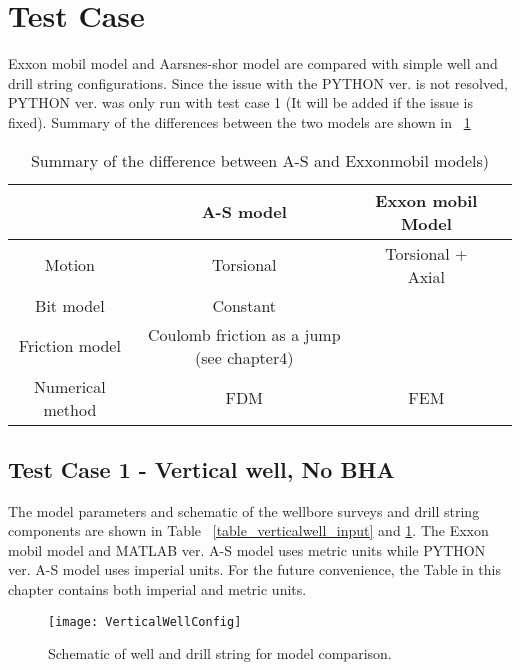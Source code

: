 \section{Test Case}
Exxon mobil model and Aarsnes-shor model are compared with simple well and drill string configurations. Since the issue with the PYTHON ver. is not resolved, PYTHON ver. was only run with test case 1 (It will be added if the issue is fixed). Summary of the differences between the two models are shown in \tablename~\ref{table_model_difference}

\begin{table}[!hbt]
\centering
\begin{tabular}{|c|c|c|c|}
\hline & A-S model & Exxon mobil Model\\
\hline
Motion & Torsional & Torsional + Axial\\                                                              
\hline
Bit model & Constant &  \\                                                  
\hline
Friction model & Coulomb friction as a jump (see chapter4) &  \\                                                  
\hline
Numerical method & FDM & FEM\\      
\hline                                                 
\end{tabular}
\caption[Summary of the difference between two models]{Summary of the difference between A-S and Exxonmobil models)}\label{table_model_difference}

\end{table}



\subsection{Test Case 1 - Vertical well, No BHA}
The model parameters and schematic of the wellbore surveys and drill string components are shown in Table \tablename~\ref{table_verticalwell_input} and \ref{figure_verticalwell}. The Exxon mobil model and MATLAB ver. A-S model uses metric units while PYTHON ver. A-S model uses imperial units. For the future convenience, the Table in this chapter contains both imperial and metric units.

\begin{figure}[!hbt]
  \centering
  \texttt{[image: VerticalWellConfig]}
  \caption[Schematic of well and drill string for model comparison.]{Schematic of well and drill string for model comparison.}\label{figure_verticalwell}
\end{figure}

